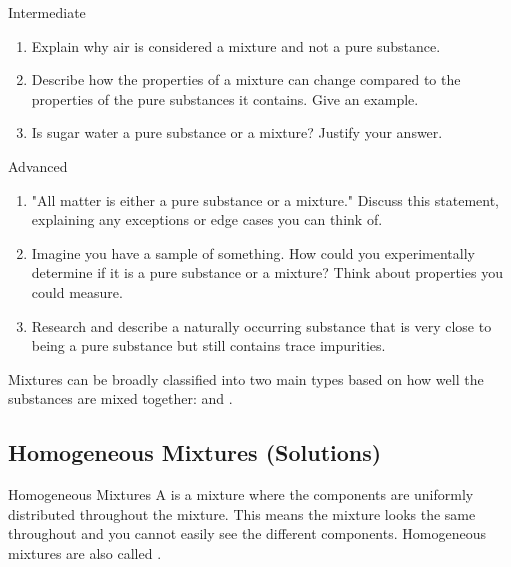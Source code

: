 \begin{tieredquestions}{Intermediate}
\begin{enumerate}
    \item Explain why air is considered a mixture and not a pure substance.
    \item Describe how the properties of a mixture can change compared to the properties of the pure substances it contains. Give an example.
    \item  Is sugar water a pure substance or a mixture? Justify your answer.
\end{enumerate}
\end{tieredquestions}

\begin{tieredquestions}{Advanced}
\begin{enumerate}
    \item  "All matter is either a pure substance or a mixture."  Discuss this statement, explaining any exceptions or edge cases you can think of.
    \item  Imagine you have a sample of something. How could you experimentally determine if it is a pure substance or a mixture?  Think about properties you could measure.
    \item  Research and describe a naturally occurring substance that is very close to being a pure substance but still contains trace impurities.
\end{enumerate}
\end{tieredquestions}


\FloatBarrier
\1

Mixtures can be broadly classified into two main types based on how well the substances are mixed together:  and .

\subsection{Homogeneous Mixtures (Solutions)}


\begin{keyconcept}{Homogeneous Mixtures}
A  is a mixture where the components are uniformly distributed throughout the mixture. This means the mixture looks the same throughout and you cannot easily see the different components. Homogeneous mixtures are also called .
\end{keyconcept}

